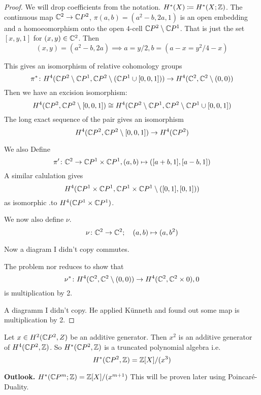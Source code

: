 \documentclass[language=english]{TemplateLecture}
\begin{document}
\begin{proof}
    We will drop coefficients from the notation. \(H^*(X) \coloneq H^*(X; \mathbb{Z})\). The continuous map \(\mathbb{C}^2 \to \mathbb{C} P^2\), \(\pi(a,b) = (a^2-b, 2a, 1)\) is an open embedding and a homoeomorphism onto the open \(4\)-cell \(\mathbb{C} P^2 \setminus \mathbb{C} P^1\). That is just the set \([x,y,1]\) for \((x,y) \in \mathbb{C}^2\). Then
    \[(x,y) = (a^2 -b, 2a) \implies a = y/2, b = (a-x = y^2/4 -x)\]

    This gives an isomorphism of relative cohomology groups
    \[\pi^*\colon H^4(\mathbb{C} P^2 \setminus \mathbb{C} P ^1, \mathbb{C} P^2 \setminus (\mathbb{C} P ^1 \cup [0,0,1])) \to H^4(\mathbb{C}^2, \mathbb{C}^2\setminus (0,0))\]
    Then we have an excision isomorphism:
    \[H^4(\mathbb{C} P^2, \mathbb{C} P ^2\setminus [0,0,1]) \cong H^4(\mathbb{C} P^2 \setminus \mathbb{C} P ^1, \mathbb{C} P ^2 \setminus \mathbb{C} P ^1 \cup [0,0,1])\]
    The long exact sequence of the pair gives an isomorphism
    \[H^4(\mathbb{C} P ^2, \mathbb{C} P ^2 \setminus[0,0,1]) \to H^4(\mathbb{C} P ^2)\]

    We also Define
    \[\pi'\colon \mathbb{C}^2 \to \mathbb{C} P ^1 \times \mathbb{C} P ^1, (a,b) \mapsto ([a+b, 1], [a-b,1])\]
    A similar calulation gives
    \[H^4(\mathbb{C} P ^1 \times \mathbb{C} P ^1, \mathbb{C} P^1 \times \mathbb{C} P ^1\setminus ([0,1], [0,1]))\]
    as isomorphic .to \(H^4(\mathbb{C} P ^1 \times \mathbb{C} P ^1)\).

    We now also define \(\nu\).
    \[\nu \colon \mathbb{C}^2 \to \mathbb{C} ^2 ; \quad (a,b) \mapsto (a, b^2)\]

    Now a diagram I didn't copy commutes.


    The problem nor reduces to show that
    \[\nu^*\colon H^4(\mathbb{C}^2, \mathbb{C}^2\setminus (0,0)) \to H^4(\mathbb{C}^2, \mathbb{C}^2\times 0) , 0\]
    is multiplication by 2.

    A diagramm I didn't copy. He applied Künneth and found out some map is multiplication by 2.
\end{proof}

\begin{proposition}
    Let \(x \in H^2(\mathbb{C} P^2, Z)\) be an additive generator. Then \(x^2\) is an additive generator of \(H^4(\mathbb{C} P^2, \mathbb{Z})\). So \(H^*(\mathbb{C} P^2, \mathbb{Z})\) is a truncated polynomial algebra i.e.
    \[H^*(\mathbb{C} P ^2, \mathbb{Z}) = \mathbb{Z}[X]/ (x^3)\]

\end{proposition}

\textbf{Outlook.} \(H^*(\mathbb{C} P^m; \mathbb{Z}) = \mathbb{Z}[X]/(x^{m+1})\)
This will be proven later using Poincaré-Duality.
\end{document}
